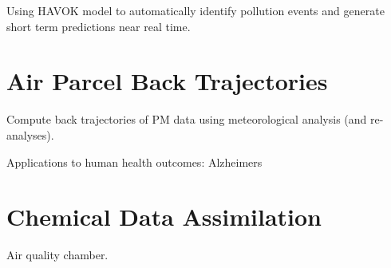 Using HAVOK model to automatically identify pollution events and generate short term predictions near real time.

\section{Air Parcel Back Trajectories}

Compute back trajectories of PM data using meteorological analysis (and re-analyses).

Applications to human health outcomes: Alzheimers


\section{Chemical Data Assimilation}

Air quality chamber.





